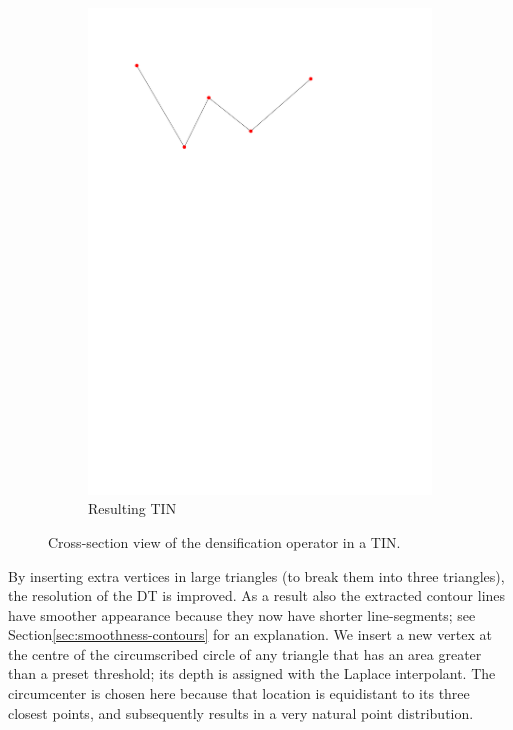 \begin{figure}
\begin{subfigure}[b]{0.35\linewidth}
    \includegraphics[width=\textwidth,page=4]{figs/1Ddensop.pdf}
    \caption{Resulting TIN}\label{fig:1Ddensop:d}
  \end{subfigure}
  \caption{Cross-section view of the densification operator in a TIN.}
\label{fig:1Ddensop}
\end{figure}

By inserting extra vertices in large triangles (to break them into three triangles), the resolution of the DT is improved.
As a result also the extracted contour lines have smoother appearance because they now have shorter line-segments; see Section\ref{sec:smoothness-contours} for an explanation.
We insert a new vertex at the centre of the circumscribed circle of any triangle that has an area greater than a preset threshold; its depth is assigned with the Laplace interpolant.
The circumcenter is chosen here because that location is equidistant to its three closest points, and subsequently results in a very natural point distribution.

